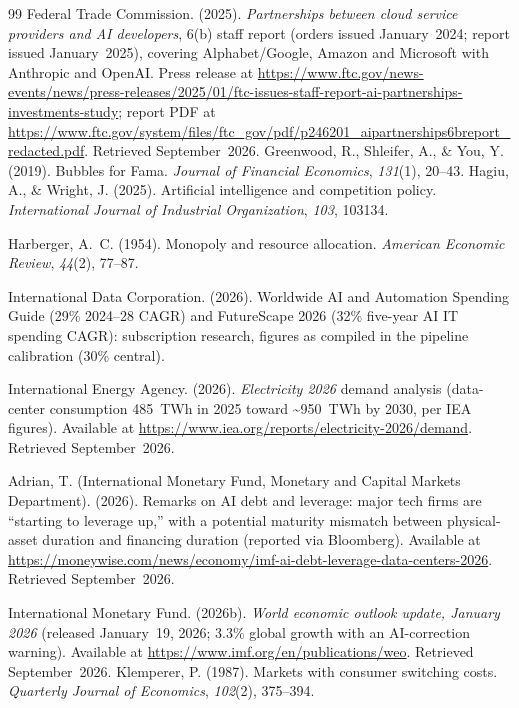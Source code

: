 \documentclass[11pt,a4paper]{article}
\begin{document}
\begin{thebibliography}{99}
Federal Trade Commission. (2025).
\emph{Partnerships between cloud service providers and AI developers},
6(b) staff report (orders issued January~2024; report issued January~2025),
covering Alphabet/Google, Amazon and Microsoft with Anthropic and OpenAI.
Press release at \url{https://www.ftc.gov/news-events/news/press-releases/2025/01/ftc-issues-staff-report-ai-partnerships-investments-study};
report PDF at \url{https://www.ftc.gov/system/files/ftc_gov/pdf/p246201_aipartnerships6breport_redacted.pdf}.
Retrieved September~2026.
Greenwood, R., Shleifer, A., \& You, Y. (2019).
Bubbles for Fama.
\emph{Journal of Financial Economics}, \emph{131}(1), 20--43.
Hagiu, A., \& Wright, J. (2025).
Artificial intelligence and competition policy.
\emph{International Journal of Industrial Organization}, \emph{103}, 103134.

Harberger, A.~C. (1954).
Monopoly and resource allocation.
\emph{American Economic Review}, \emph{44}(2), 77--87.

International Data Corporation. (2026).
Worldwide AI and Automation Spending Guide (29\% 2024--28 CAGR) and
FutureScape 2026 (32\% five-year AI IT spending CAGR): subscription
research, figures as compiled in the pipeline calibration (30\% central).

International Energy Agency. (2026).
\emph{Electricity 2026} demand analysis (data-center consumption
485~TWh in 2025 toward \textasciitilde950~TWh by 2030, per IEA figures).
Available at \url{https://www.iea.org/reports/electricity-2026/demand}.
Retrieved September~2026.

Adrian, T. (International Monetary Fund, Monetary and Capital Markets
Department). (2026).
Remarks on AI debt and leverage: major tech firms are ``starting to
leverage up,'' with a potential maturity mismatch between physical-asset
duration and financing duration (reported via Bloomberg).
Available at \url{https://moneywise.com/news/economy/imf-ai-debt-leverage-data-centers-2026}.
Retrieved September~2026.

International Monetary Fund. (2026b).
\emph{World economic outlook update, January 2026} (released January~19,
2026; 3.3\% global growth with an AI-correction warning).
Available at \url{https://www.imf.org/en/publications/weo}.
Retrieved September~2026.
Klemperer, P. (1987).
Markets with consumer switching costs.
\emph{Quarterly Journal of Economics}, \emph{102}(2), 375--394.


\end{thebibliography}
\end{document}

